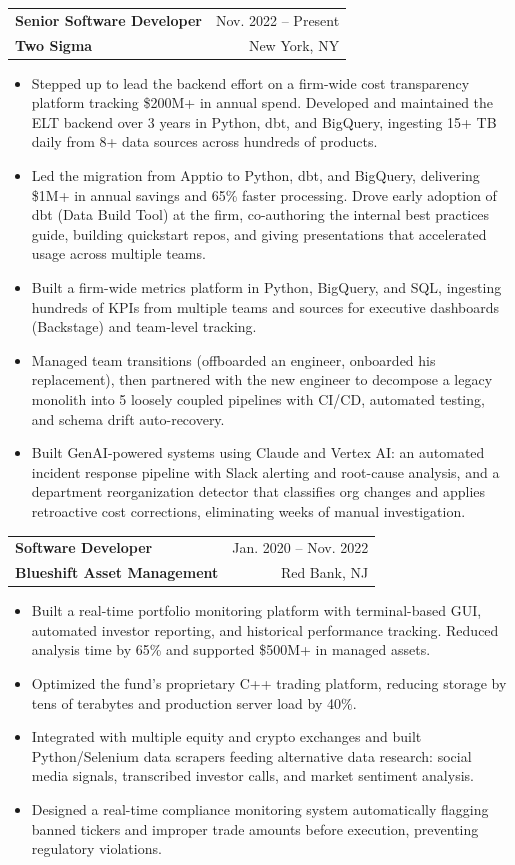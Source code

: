\documentclass[letterpaper,11pt]{article}
\makeatletter
\newcommand{\resumeItem}[1]{
  \item\small{
    {#1 \vspace{-2pt}}
  }
}
\newcommand{\resumeSubheading}[4]{
  \vspace{-2pt}\item
    \begin{tabular*}{0.97\textwidth}[t]{l@{\extracolsep{\fill}}r}
      \textbf{\normalsize #1} & {\small #2} \\
      {\small\color{sectionblue}\textbf{#3}} & {\small #4} \\
    \end{tabular*}\vspace{-7pt}
}
\newcommand{\resumeItemListStart}{\begin{itemize}\setlength{\itemsep}{0pt}}
\newcommand{\resumeItemListEnd}{\end{itemize}\vspace{-5pt}}
\makeatother
\begin{document}
    \resumeSubheading
      {Senior Software Developer}{Nov. 2022 -- Present}
      {Two Sigma}{New York, NY}
      \resumeItemListStart
        \resumeItem{Stepped up to lead the backend effort on a firm-wide cost transparency platform tracking \$200M+ in annual spend. Developed and maintained the ELT backend over 3 years in Python, dbt, and BigQuery, ingesting 15+ TB daily from 8+ data sources across hundreds of products.}
        \resumeItem{Led the migration from Apptio to Python, dbt, and BigQuery, delivering \$1M+ in annual savings and 65\% faster processing. Drove early adoption of dbt (Data Build Tool) at the firm, co-authoring the internal best practices guide, building quickstart repos, and giving presentations that accelerated usage across multiple teams.}
        \resumeItem{Built a firm-wide metrics platform in Python, BigQuery, and SQL, ingesting hundreds of KPIs from multiple teams and sources for executive dashboards (Backstage) and team-level tracking.}
        \resumeItem{Managed team transitions (offboarded an engineer, onboarded his replacement), then partnered with the new engineer to decompose a legacy monolith into 5 loosely coupled pipelines with CI/CD, automated testing, and schema drift auto-recovery.}
        \resumeItem{Built GenAI-powered systems using Claude and Vertex AI: an automated incident response pipeline with Slack alerting and root-cause analysis, and a department reorganization detector that classifies org changes and applies retroactive cost corrections, eliminating weeks of manual investigation.}
      \resumeItemListEnd
    \vspace{1pt}

    \resumeSubheading
      {Software Developer}{Jan. 2020 -- Nov. 2022}
      {Blueshift Asset Management}{Red Bank, NJ}
      \resumeItemListStart
        \resumeItem{Built a real-time portfolio monitoring platform with terminal-based GUI, automated investor reporting, and historical performance tracking. Reduced analysis time by 65\% and supported \$500M+ in managed assets.}
        \resumeItem{Optimized the fund's proprietary C++ trading platform, reducing storage by tens of terabytes and production server load by 40\%.}
        \resumeItem{Integrated with multiple equity and crypto exchanges and built Python/Selenium data scrapers feeding alternative data research: social media signals, transcribed investor calls, and market sentiment analysis.}
        \resumeItem{Designed a real-time compliance monitoring system automatically flagging banned tickers and improper trade amounts before execution, preventing regulatory violations.}
      \resumeItemListEnd
    \vspace{1pt}
\end{document}
